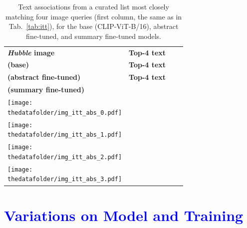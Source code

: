 \documentclass[10pt]{article} %
\newcommand{\hubble}{\emph{Hubble}\xspace}
\newcommand{\changes}[1]{\textcolor{blue}{#1}}
\begin{document}
\begin{table}[t!]
  \centering
  \renewcommand{\arraystretch}{0.1}
  \begin{tabular}{m{3cm} m{3.9cm} m{3.9cm} m{3.9cm}}
      \toprule
      \centering \bfseries \hubble image & \centering \textbf{Top-4 text} \\ \textbf{\textcolor{deeppurple}{(base)}} & \centering  \textbf{Top-4 text} \\ \textbf{\textcolor{deepblue}{(abstract fine-tuned)}} & \centering  \textbf{Top-4 text} \\ \textbf{\textcolor{deepred}{(summary fine-tuned)}} \tabularnewline
      \midrule
      \centering \texttt{[image: \\thedatafolder/img\_itt\_abs\_0.pdf]} & \centering \scriptsize  & \centering  \scriptsize  &  {\scriptsize } \tabularnewline
      \midrule
      \centering \texttt{[image: \\thedatafolder/img\_itt\_abs\_1.pdf]} & \centering \scriptsize  & \centering  \scriptsize  &  {\scriptsize } \tabularnewline
      \midrule
      \centering \texttt{[image: \\thedatafolder/img\_itt\_abs\_2.pdf]} & \centering \scriptsize  & \centering  \scriptsize  &  {\scriptsize } \tabularnewline
      \midrule
      \centering \texttt{[image: \\thedatafolder/img\_itt\_abs\_3.pdf]} & \centering \scriptsize  & \centering  \scriptsize  &  {\scriptsize } \tabularnewline
      \bottomrule
  \end{tabular}
  \caption{Text associations from a curated list most closely matching four image queries (first column, the same as in Tab.~\ref{tab:itt}), for the \textcolor{deeppurple}{base} (CLIP-ViT-B/16), \textcolor{deepblue}{abstract fine-tuned}, and \textcolor{deepred}{summary fine-tuned} models.}
  \label{tab:itt_abs}
\end{table}

\section{\changes{Variations on Model and Training}}
\label{app:ablations}
\end{document}
